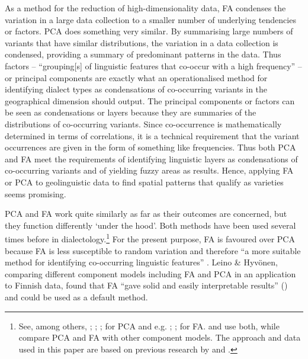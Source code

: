 \documentclass[output=paper]{LSP/langsci}
\begin{document}
As a method for the reduction of high-dimensionality data, FA condenses the variation in a large data collection to a smaller number of underlying tendencies or factors. PCA does something very similar. By summarising large numbers of variants that have similar distributions, the variation in a data collection is condensed, providing a summary of predominant patterns in the data. Thus factors – “grouping[s] of linguistic features that co-occur with a high frequency” – or principal components are exactly what an operationalised method for identifying dialect types as condensations of co-occurring variants in the geographical dimension should output. The principal components or factors can be seen as condensations or layers because they are summaries of the distributions of co-occurring variants. Since co-occurrence is mathematically determined in terms of correlations, it is a technical requirement that the variant occurrences are given in the form of something like frequencies. Thus both PCA and FA meet the requirements of identifying linguistic layers as condensations of co-occurring variants and of yielding fuzzy areas as results. Hence, applying FA or PCA to geolinguistic data to find spatial patterns that qualify as varieties seems promising.

PCA and FA work quite similarly as far as their outcomes are concerned, but they function differently ‘under the hood’. Both methods have been used several times before in dialectology.\footnote{See, among others, \citealt{shackleton_english-american_2005}; \citealt{hyvonen_multivariate_2007}; \citealt{szmrecsanyi_holistic_2011}; \citealt{wieling_analyzing_2013} for PCA and e.g. \citealt{clopper_north_2006}; \citealt{nerbonne_identifying_2006}; \citealt{grieve_statistical_2011} for FA. \citealt{grieve_corpus-based_2009} and \citealt{leinonen_acoustic_2010} use both, while \citealt{leino_comparison_2008} compare PCA and FA with other component models. The approach and data used in this paper are based on previous research by \citet{pickl_probabilistische_2013, pickl_verdichtungen_2013,buhler_dialektraume_2014,elmentaler_latente_2015} and \citet{proll_raumvariation_2015}.} For the present purpose, FA is favoured over PCA because FA is less susceptible to random variation and therefore “a more suitable method for identifying co-occurring linguistic features” \citep[106]{leinonen_acoustic_2010}. Leino \& Hyvönen, comparing different component models including FA and PCA in an application to Finnish data, found that FA “gave solid and easily interpretable results” (\citeyear[186]{leino_comparison_2008}) and could be used as a default method.
\end{document}
